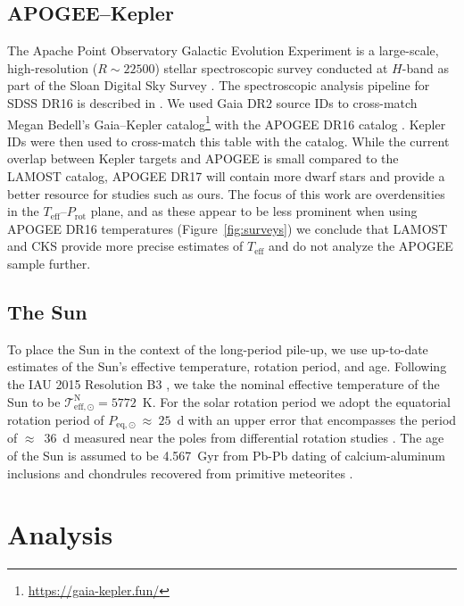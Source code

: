 \documentclass[linenumbers,tighten,trackchanges,twocolumn]{aastex631}
\newcommand{\teff}{\ensuremath{T_{\mathrm{eff}}}\xspace}
\newcommand{\prot}{\ensuremath{P_\mathrm{rot}}\xspace}
\begin{document}
\subsection{APOGEE--Kepler}
The Apache Point Observatory Galactic Evolution Experiment \citep[APOGEE;][]{Majewski2017} is a large-scale, high-resolution ($R \sim 22500$) stellar spectroscopic survey conducted at $H$-band as part of the Sloan Digital Sky Survey \citep[SDSS-IV;][]{Blanton2017}. The spectroscopic analysis pipeline for SDSS DR16 is described in \citet{Jonsson2020}. We used Gaia DR2 source IDs \citep{Gaia2016, Gaia2018} to cross-match Megan Bedell's Gaia--Kepler catalog\footnote{\url{https://gaia-kepler.fun/}} with the APOGEE DR16 catalog \citep{Ahumada2020}. Kepler IDs were then used to cross-match this table with the \citet{McQuillan2014} catalog. While the current overlap between Kepler targets and APOGEE is small compared to the LAMOST catalog, APOGEE DR17 will contain more dwarf stars and provide a better resource for studies such as ours. The focus of this work are overdensities in the \teff--\prot plane, and as these appear to be less prominent when using  APOGEE DR16 temperatures (Figure~\ref{fig:surveys}) we conclude that LAMOST and CKS provide more precise estimates of \teff and do not analyze the APOGEE sample further. 

\subsection{The Sun}
To place the Sun in the context of the long-period pile-up, we use up-to-date estimates of the Sun's effective temperature, rotation period, and age. Following the IAU 2015 Resolution B3 \citep{Prsa2016}, we take the nominal effective temperature of the Sun to be $\mathcal{T}^\mathrm{N}_\mathrm{eff,\odot} = 5772$~K. For the solar rotation period we adopt the equatorial rotation period of $P_\mathrm{eq,\odot}~\approx~25$~d with an upper error that encompasses the period of $\approx$~36~d measured near the poles from differential rotation studies \citep[][and references therein]{Thompson2003}.  The age of the Sun is assumed to be 4.567~Gyr from Pb-Pb dating of calcium-aluminum inclusions and chondrules recovered from primitive meteorites \citep[][and references therein]{Bahcall1995}.

\section{Analysis}
\label{sec:analysis}
\end{document}
